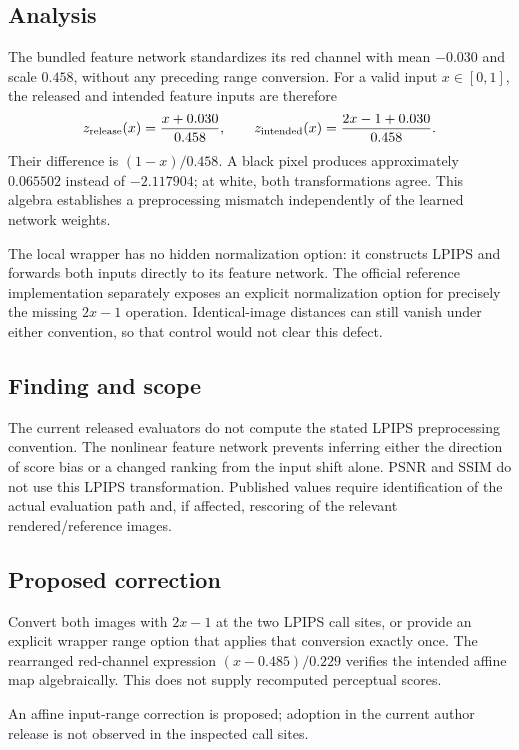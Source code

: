 \documentclass[11pt]{article}
\begin{document}
\subsection*{Analysis}

The bundled feature network standardizes its red channel with mean \(-0.030\) and scale \(0.458\), without any preceding range conversion. For a valid input \(x\in[0,1]\), the released and intended feature inputs are therefore \[z_{\rm release}(x)=\frac{x+0.030}{0.458},\qquad z_{\rm intended}(x)=\frac{2x-1+0.030}{0.458}.\] Their difference is \((1-x)/0.458\). A black pixel produces approximately \(0.065502\) instead of \(-2.117904\); at white, both transformations agree. This algebra establishes a preprocessing mismatch independently of the learned network weights.

The local wrapper has no hidden normalization option: it constructs LPIPS and forwards both inputs directly to its feature network. The official reference implementation separately exposes an explicit normalization option for precisely the missing \(2x-1\) operation. Identical-image distances can still vanish under either convention, so that control would not clear this defect.

\subsection*{Finding and scope}

The current released evaluators do not compute the stated LPIPS preprocessing convention. The nonlinear feature network prevents inferring either the direction of score bias or a changed ranking from the input shift alone. PSNR and SSIM do not use this LPIPS transformation. Published values require identification of the actual evaluation path and, if affected, rescoring of the relevant rendered/reference images.

\subsection*{Proposed correction}

Convert both images with \(2x-1\) at the two LPIPS call sites, or provide an explicit wrapper range option that applies that conversion exactly once. The rearranged red-channel expression \((x-0.485)/0.229\) verifies the intended affine map algebraically. This does not supply recomputed perceptual scores.

An affine input-range correction is proposed; adoption in the current author release is not observed in the inspected call sites.
\end{document}
